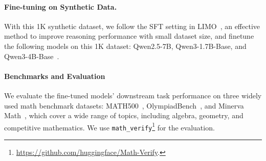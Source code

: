 
\paragraph{Fine-tuning on Synthetic Data.} With this 1K synthetic dataset, we follow the SFT setting in LIMO~\citep{ye2025limoreasoning}, an effective method to improve reasoning performance with small dataset size, and finetune the following models on this 1K dataset: Qwen2.5-7B, Qwen3-1.7B-Base, and Qwen3-4B-Base~\citep{qwen2025qwen25technicalreport, yang2025qwen3technicalreport}. %


\paragraph{Benchmarks and Evaluation} 

We evaluate the fine-tuned models' downstream task performance on three widely used math benchmark datasets: MATH500~\citep{hendrycksmath2021}, OlympiadBench~\citep{he2024olympiadbench}, and Minerva Math~\citep{lewkowycz2022solving}, which cover a wide range of topics, including algebra, geometry, and competitive mathematics. We use \texttt{math\_verify}\footnote{\url{https://github.com/huggingface/Math-Verify}.}  for the evaluation. 

